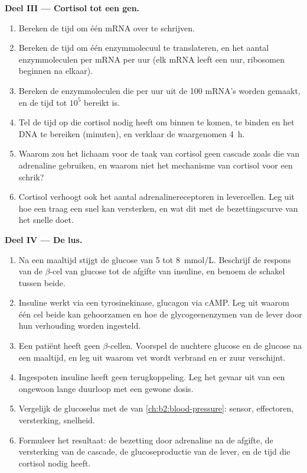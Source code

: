 \begin{problem}
\medskip
\noindent\textbf{Deel III --- Cortisol tot een gen.}
\begin{enumerate}[resume]
  \item Bereken de tijd om één mRNA over te schrijven.
  \item Bereken de tijd om één enzymmolecuul te translateren, en het aantal
        enzymmoleculen per mRNA per uur (elk mRNA leeft een uur, ribosomen
        beginnen na elkaar).
  \item Bereken de enzymmoleculen die per uur uit de \num{100} mRNA's worden
        gemaakt, en de tijd tot $10^{5}$ bereikt is.
  \item Tel de tijd op die cortisol nodig heeft om binnen te komen, te binden
        en het DNA te bereiken (minuten), en verklaar de waargenomen
        \qty{4}{h}.
  \item Waarom zou het lichaam voor de taak van cortisol geen cascade zoals
        die van adrenaline gebruiken, en waarom niet het mechanisme van
        cortisol voor een schrik?
  \item Cortisol verhoogt ook het aantal adrenalinereceptoren in levercellen.
        Leg uit hoe een traag  een snel  kan versterken, en wat
        dit met de bezettingscurve van het snelle doet.
\end{enumerate}

\medskip
\noindent\textbf{Deel IV --- De lus.}
\begin{enumerate}[resume]
  \item Na een maaltijd stijgt de glucose van 5 tot \qty{8}{mmol/L}.
        Beschrijf de respons van de $\beta$-cel van glucose tot de afgifte van
        insuline, en benoem de schakel tussen beide.
  \item Insuline werkt via een tyrosinekinase, glucagon via cAMP. Leg uit
        waarom één cel beide kan gehoorzamen en hoe de glycogeenenzymen van de
        lever door hun verhouding worden ingesteld.
  \item Een patiënt heeft geen $\beta$-cellen. Voorspel de nuchtere glucose
        en de glucose na een maaltijd, en leg uit waarom vet wordt verbrand en
        er zuur verschijnt.
  \item Ingespoten insuline heeft geen terugkoppeling. Leg het gevaar uit van
        een ongewoon lange duurloop met een gewone dosis.
  \item Vergelijk de glucoselus met de  van
        \cref{ch:b2:blood-pressure}: sensor, effectoren, versterking, snelheid.
  \item Formuleer het resultaat: de bezetting door adrenaline na de afgifte,
        de versterking van de cascade, de glucoseproductie van de lever, en de
        tijd die cortisol nodig heeft.
\end{enumerate}
\end{problem}
